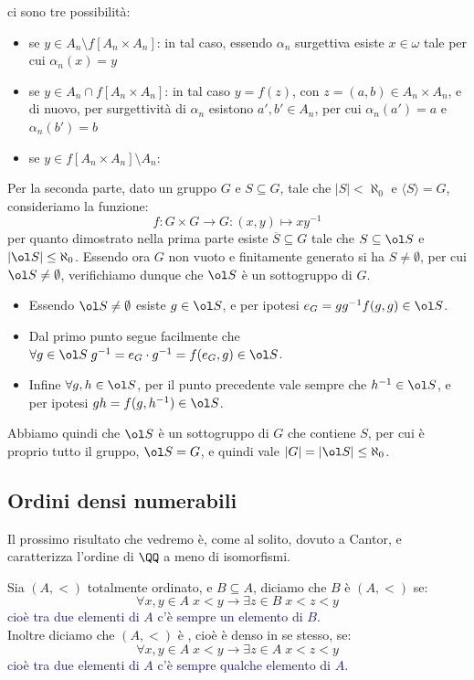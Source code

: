 \begin{soln}[DA COMPLETARE]
\begin{itemize}
		ci sono tre possibilità:
		\begin{itemize}
			\item se $y \in A_n \setminus f[A_n \times A_n]$: in tal caso, essendo $\alpha_n$ surgettiva esiste $x \in \omega$ tale per cui $\alpha_n(x) = y$
			\item se $y \in A_n \cap f[A_n \times A_n]$: in tal caso $y = f(z)$, con $z = (a,b) \in A_n \times A_n$, e di nuovo, per surgettività di $\alpha_n$ esistono $a',b' \in A_n$, per cui $\alpha_n(a') = a$ e $\alpha_n(b') = b$
			\item se $y \in f[A_n \times A_n] \setminus A_n$:
		\end{itemize}
	\end{itemize}
	Per la seconda parte, dato un gruppo $G$ e $S \subseteq G$, tale che $|S| < \aleph_0$ e $\langle S \rangle = G$, consideriamo la funzione:
	\[ f : G \times G \to G : (x,y) \mapsto xy^{-1}
		\]
	per quanto dimostrato nella prima parte esiste $\overline{S} \subseteq G$ tale che $S \subseteq \ol S$ e $|\ol S| \leq \aleph_0$. Essendo ora $G$ non vuoto e finitamente generato si ha $S \ne \emptyset$,
	per cui $\ol S \ne \emptyset$, verifichiamo dunque che $\ol S$ è un sottogruppo di $G$.
	\begin{itemize}
		\item Essendo $\ol S \ne \emptyset$ esiste $g \in \ol S$, e per ipotesi $e_G = gg^{-1} f(g,g) \in \ol S$.
		\item Dal primo punto segue facilmente che $\forall g \in \ol S \; g^{-1} = e_G \cdot g^{-1} = f(e_G,g) \in \ol S$.
		\item Infine $\forall g,h \in \ol S$, per il punto precedente vale sempre che $h^{-1} \in \ol S$, e per ipotesi $gh = f(g,h^{-1}) \in \ol S$.
	\end{itemize}
	Abbiamo quindi che $\ol S$ è un sottogruppo di $G$ che contiene $S$, per cui è proprio tutto il gruppo, $\ol S = G$, e quindi vale $|G| = |\ol S| \leq \aleph_0$.
\end{soln}

\subsection{Ordini densi numerabili}
Il prossimo risultato che vedremo è, come al solito, dovuto a Cantor, e caratterizza l'ordine di $\QQ$ a meno di isomorfismi.

\begin{definition}[Densità]
	Sia $(A,<)$ totalmente ordinato, e $B \subseteq A$, diciamo che $B$ è  $(A,<)$ se:
	\[ \forall x,y \in A \; x < y \rightarrow \exists z \in B \; x < z < y
		\]
	\textcolor{MidnightBlue}{cioè tra due elementi di $A$ c'è sempre un elemento di $B$}.\\
	Inoltre diciamo che $(A, <)$ è , cioè è denso in se stesso, se:
	\[ \forall x,y \in A \; x < y \rightarrow \exists z \in A \; x < z < y
		\]
	\textcolor{MidnightBlue}{cioè tra due elementi di $A$ c'è sempre qualche elemento di $A$}.
\end{definition}

